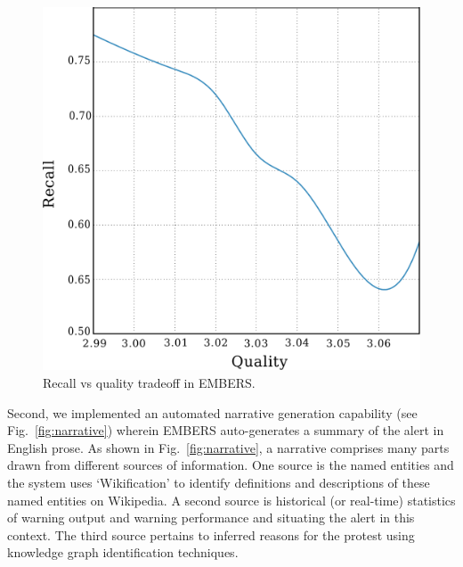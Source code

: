\begin{figure}[h]
\centering
\includegraphics[width=\columnwidth]{figures/cu/recallVsQS.pdf}
\caption{Recall vs quality tradeoff in EMBERS.}
\label{fig:recallVsQS}
\end{figure}


Second, we implemented an automated narrative generation capability
(see Fig.~\ref{fig:narrative}) wherein EMBERS auto-generates a summary
of the alert in English prose. As shown in Fig.~\ref{fig:narrative},
a narrative comprises many parts drawn from different sources
of information. One source is the named entities and the system uses
`Wikification' to identify definitions and descriptions of these
named entities on Wikipedia. A second source is historical (or real-time)
statistics of warning output and warning performance and situating the
alert in this context. The third source pertains to inferred reasons for
the protest using knowledge graph identification techniques.

